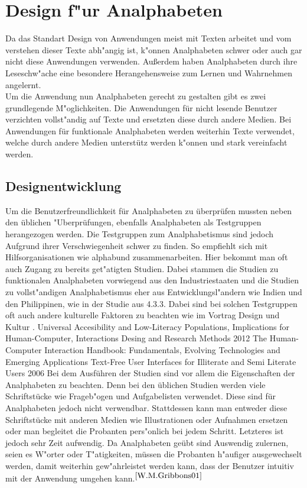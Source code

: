 \section{Design f"ur Analphabeten}
Da das Standart Design von Anwendungen meist mit Texten arbeitet und vom verstehen dieser Texte abh"angig ist, k"onnen Analphabeten  schwer oder auch gar nicht diese Anwendungen verwenden. Außerdem haben Analphabeten durch ihre Leseschw"ache eine besondere Herangehensweise zum Lernen und Wahrnehmen angelernt.\\
Um die Anwendung nun Analphabeten gerecht zu gestalten gibt es zwei grundlegende M"oglichkeiten.
Die Anwendungen für nicht lesende Benutzer verzichten vollst"andig auf Texte und ersetzten diese durch  andere Medien. Bei Anwendungen für funktionale Analphabeten werden weiterhin Texte verwendet, welche durch andere Medien unterstütz werden k"onnen und stark vereinfacht werden.

\subsection{Designentwicklung}\label{sec:designEval}
Um die Benutzerfreundlichkeit für Analphabeten zu überprüfen mussten neben den üblichen "Uberprüfungen, ebenfalls Analphabeten als Testgruppen herangezogen werden. Die Testgruppen zum Analphabetismus sind jedoch Aufgrund ihrer Verschwiegenheit schwer zu finden. So empfiehlt sich mit  Hilfsorganisationen wie \glqq alphabund \grqq zusammenarbeiten. Hier bekommt man oft auch Zugang zu bereits get"atigten Studien. Dabei stammen die Studien zu funktionalen Analphabeten vorwiegend aus den Industriestaaten und die Studien zu vollst"andigen Analphabetismus eher aus Entwicklungsl"andern wie Indien und den Philippinen,  wie in der Studie aus 4.3.3. Dabei sind bei solchen Testgruppen oft auch andere kulturelle Faktoren zu beachten wie im Vortrag \glqq Design und Kultur \grqq.  
					{Universal Accesibility and Low-Literacy Populations, Implications for Human-Computer, Interactions Desing and Research Methods}
					{2012}
					{The Human-Computer Interaction Handbook: Fundamentals, Evolving Technologies and Emerging Applications}
					{Text-Free User Interfaces for Illiterate and Semi Literate Users}
					{2006}{}
Bei dem Ausführen der Studien sind vor allem die Eigenschaften der Analphabeten zu beachten.
Denn bei den üblichen Studien werden viele Schriftstücke wie Frageb"ogen und Aufgabelisten verwendet.
Diese sind für Analphabeten jedoch nicht verwendbar. Stattdessen kann man entweder diese Schriftstücke mit anderen Medien wie Illustrationen oder Aufnahmen ersetzen oder man begleitet die Probanten pers"onlich bei jedem Schritt. Letzteres ist jedoch sehr Zeit aufwendig. Da Analphabeten geübt sind Auswendig zulernen, seien es W"orter oder T"atigkeiten, müssen die Probanten h"aufiger ausgewechselt werden, damit weiterhin gew"ahrleistet werden kann, dass der Benutzer intuitiv mit der Anwendung umgehen kann.$^{\ref{W.M.Gribbons01}}$\\

